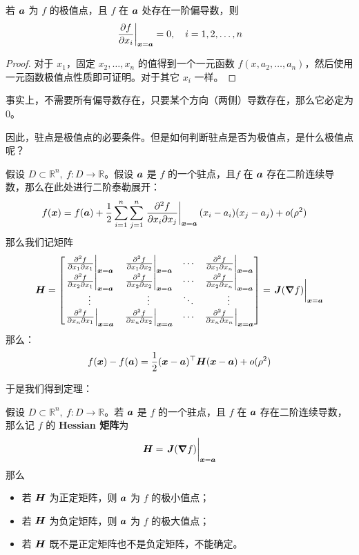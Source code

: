 \begin{theorem}
    若 $\boldsymbol{a}$ 为 $f$ 的极值点，且 $f$ 在 $\boldsymbol{a}$ 处存在一阶偏导数，则
    $$
    \eval{\pdv{f}{x_i}}_{\vect{x} = \vect{a}} = 0, \quad i = 1, 2, \dots, n
    $$
    \begin{proof}
        对于 $x_1$，固定 $x_2, \dots, x_n$ 的值得到一个一元函数 $f(x, a_2, \dots, a_n)$，然后使用一元函数极值点性质即可证明。对于其它 $x_i$ 一样。
    \end{proof}
\end{theorem}

\begin{remark}
    事实上，不需要所有偏导数存在，只要某个方向（两侧）导数存在，那么它必定为 $0$。
\end{remark}

因此，驻点是极值点的必要条件。但是如何判断驻点是否为极值点，是什么极值点呢？

假设 $D \subset \mathbb{R}^{n},\ f: D \to \mathbb{R}$。假设 $\boldsymbol{a}$ 是 $f$ 的一个驻点，且$f$ 在 $\boldsymbol{a}$ 存在二阶连续导数，那么在此处进行二阶泰勒展开：
$$
\begin{aligned}
    f(\vect{x}) & = f(\vect{a}) + \frac{1}{2} \sum_{i = 1}^{n} \sum_{j = 1}^{n} \eval{\pdv[2]{f}{x_i}{x_j}}_{\vect{x} = \vect{a}} (x_i - a_i) (x_j - a_j) + o(\rho^{2})
\end{aligned}
$$
那么我们记矩阵
$$
\matr{H} = \begin{bmatrix}
    \eval{\pdv[2]{f}{x_1}{x_1}}_{\vect{x} = \vect{a}} & \eval{\pdv[2]{f}{x_1}{x_2}}_{\vect{x} = \vect{a}} & \cdots & \eval{\pdv[2]{f}{x_1}{x_n}}_{\vect{x} = \vect{a}} \\
    \eval{\pdv[2]{f}{x_2}{x_1}}_{\vect{x} = \vect{a}} & \eval{\pdv[2]{f}{x_2}{x_2}}_{\vect{x} = \vect{a}} & \cdots & \eval{\pdv[2]{f}{x_2}{x_n}}_{\vect{x} = \vect{a}} \\
    \vdots & \vdots & \ddots & \vdots \\
    \eval{\pdv[2]{f}{x_n}{x_1}}_{\vect{x} = \vect{a}} & \eval{\pdv[2]{f}{x_n}{x_2}}_{\vect{x} = \vect{a}} & \cdots & \eval{\pdv[2]{f}{x_n}{x_n}}_{\vect{x} = \vect{a}} 
\end{bmatrix} = \eval{\matr{J}(\grad f)}_{\vect{x} = \vect{a}}
$$
那么：
$$
f(\boldsymbol{x}) - f(\boldsymbol{a}) = \frac{1}{2} (\boldsymbol{x} - \boldsymbol{a})^\top \boldsymbol{H} (\boldsymbol{x} - \boldsymbol{a}) + o(\rho^{2})
$$

于是我们得到定理：

\begin{theorem}
    假设 $D \subset \mathbb{R}^{n},\ f: D \to \mathbb{R}$。若 $\boldsymbol{a}$ 是 $f$ 的一个驻点，且 $f$ 在 $\boldsymbol{a}$ 存在二阶连续导数，那么记 $f$ 的 \textbf{Hessian 矩阵}为
    $$
    \matr{H} = \eval{\matr{J}(\grad f)}_{\vect{x} = \vect{a}}
    $$
    那么
    \begin{itemize}
        \item 若 $\boldsymbol{H}$ 为正定矩阵，则 $\boldsymbol{a}$ 为 $f$ 的极小值点；
        \item 若 $\boldsymbol{H}$ 为负定矩阵，则 $\boldsymbol{a}$ 为 $f$ 的极大值点；
        \item 若 $\boldsymbol{H}$ 既不是正定矩阵也不是负定矩阵，不能确定。
    \end{itemize}
\end{theorem}


